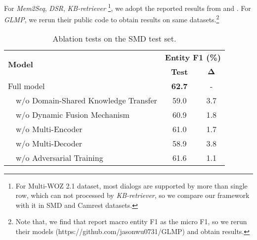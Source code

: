 \documentclass[11pt,a4paper]{article}
\begin{document}
For \textit{Mem2Seq}, \textit{DSR}, \textit{KB-retriever} \footnote{For Multi-WOZ 2.1 dataset, most dialogs are supported by more than single row, which can not processed by \textit{KB-retriever}, so we compare our framework with it in SMD and Camrest datasets.}, we adopt the reported results from  and .
For \textit{GLMP}, we rerun their public code to obtain results on same datasets.\footnote{Note that, we find that  report macro entity F1 as the micro F1, so we rerun their models (https://github.com/jasonwu0731/GLMP) and obtain results.} \

\begin{table}[t]
	\centering
	\begin{adjustbox}{width=0.45\textwidth}
		\begin{tabular}{l|c|c}
			\hline
			\multirow{2}{*}{\textbf{Model}} & \multicolumn{2}{c}{\textbf{Entity F1 (\%)}} \\ \cline{2-3} 
			& \textbf{Test} & $\boldsymbol\Delta$ \\ \hline \hline
			Full model & \textbf{62.7} & - \\ \hline
			\hline
~~w/o Domain-Shared Knowledge Transfer & 59.0 & 3.7 \\ \hline
			~~w/o Dynamic Fusion Mechanism & 60.9 & 1.8 \\ \hline
			~~w/o Multi-Encoder & 61.0 & 1.7 \\ \hline
			~~w/o Multi-Decoder & 58.9 & 3.8 \\ \hline
			~~w/o Adversarial Training & 61.6 & 1.1 \\ \hline
		
		\end{tabular}
	\end{adjustbox}
	\caption{Ablation tests on the
		SMD test set. 
}
	\label{tab:ablation}
\end{table}
\end{document}
